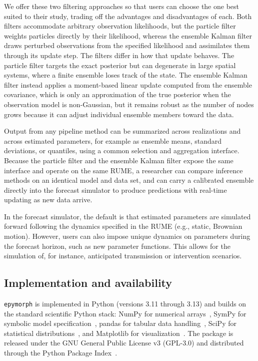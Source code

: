 We offer these two filtering approaches so that users can choose the one best suited to
their study, trading off the advantages and disadvantages of each. 
Both filters accommodate arbitrary observation likelihoods, but the particle filter weights particles directly by their likelihood, whereas the ensemble Kalman filter draws perturbed observations from the specified likelihood and assimilates them through its update step. 
The filters differ in how that update behaves. 
The particle filter targets the exact posterior but can degenerate in large spatial systems, where a finite ensemble loses track of the state.
The ensemble Kalman filter instead applies a moment-based linear update computed from the ensemble covariance, which is only an approximation of the true posterior when the observation model is non-Gaussian, but it remains robust as the number of nodes grows because it can adjust individual ensemble members toward the data.

Output from any pipeline method can be summarized across realizations and across estimated parameters, for example as ensemble means, standard deviations, or quantiles, using a common selection and aggregation interface. 
Because the particle filter and the ensemble Kalman filter expose the same interface and operate on the same RUME, a researcher can compare inference methods on an identical model and data set, and can carry a calibrated ensemble directly into the forecast simulator to produce predictions with real-time updating as new
data arrive.

In the forecast simulator, the default is that estimated parameters are simulated forward following the dynamics specified in the RUME (e.g., static, Brownian motion).
However, users can also impose unique dynamics on parameters during the forecast horizon, such as new parameter functions. 
This allows for the simulation of, for instance, anticipated transmission or intervention scenarios.

\subsection{Implementation and availability}

\texttt{epymorph} is implemented in Python (versions 3.11 through 3.13) and builds on the standard scientific Python stack: NumPy for numerical arrays~\citep{harris_array_2020}, SymPy for symbolic model specification~\citep{meurer_sympy_2017}, pandas for tabular data handling~\citep{mckinney_data_2010}, SciPy for statistical distributions~\citep{virtanen_scipy_2020}, and Matplotlib for visualization~\citep{hunter_matplotlib_2007}. 
The package is released under the GNU General Public License v3 (GPL-3.0) and distributed through the Python Package Index~\citep{mihaljevic_epymorph_2026}.